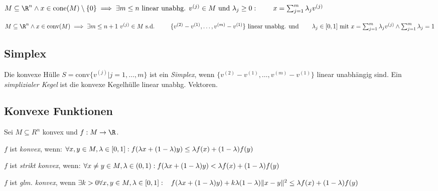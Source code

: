 \(M \subseteq \R^n \land x \in \text{cone}(M) \setminus \{0\} \\ \implies \exists m \leq n \text{ linear unabhg. } v^{(j)} \in M \text{ und } \lambda_j \geq 0 : \\ \phantom{\implies} x = \sum_{j=1}^m \lambda_j v^{(j)}\)

\spacing

\(M \subseteq \R^n \land x \in \text{conv}(M) \\ \implies \exists m \leq n+1 \ v^{(j)} \in M \text{ s.d. } \\ \phantom{\implies} \{v^{(2)} - v^{(1)},\dots,v^{(m)}-v^{(1)}\} \text{ linear unabhg. und} \\ \phantom{\implies} \lambda_j \in [0,1] \text{ mit } x = \sum_{j=1}^m \lambda_j v^{(j)} \land \sum_{j=1}^m \lambda_j = 1\)

\subsection*{Simplex}

Die konvexe Hülle \(S = \text{conv}\{v^{(j)} | j=1,\dots,m\}\) ist ein \emph{Simplex}, wenn \(\{v^{(2)} - v^{(1)},\dots,v^{(m)}-v^{(1)}\}\) linear unabhängig sind. Ein \emph{simplizialer Kegel} ist die konvexe Kegelhülle linear unabhg. Vektoren.

\subsection*{Konvexe Funktionen}

Sei \(M \subseteq R^n\) konvex und \(f : M \to \R\).

\spacing

\(f\) ist \emph{konvex}, wenn: \(\forall x, y \in M, \lambda \in [0,1] : \\ f(\lambda x + (1-\lambda)y) \leq \lambda f(x) + (1-\lambda)f(y)\)

\spacing

\(f\) ist \emph{strikt konvex}, wenn: \(\forall x \neq y \in M, \lambda \in (0,1) : \\ f(\lambda x + (1-\lambda)y) < \lambda f(x) + (1-\lambda)f(y)\)

\spacing

\(f\) ist \emph{glm. konvex}, wenn \(\exists k > 0 \forall x, y \in M, \lambda \in [0,1] : \\ \hspace*{3mm} f(\lambda x + (1-\lambda)y) + k\lambda(1-\lambda)\|x-y\|^2 \\ \leq \lambda f(x) + (1-\lambda)f(y)\)
